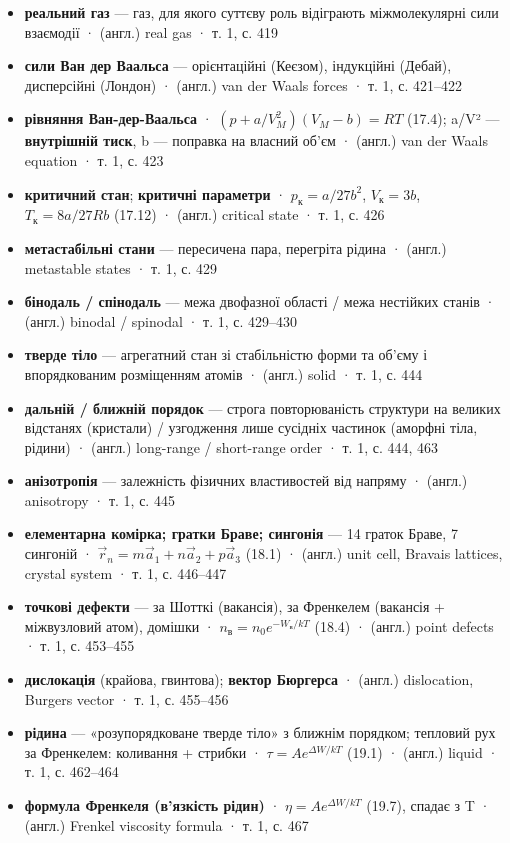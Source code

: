 \documentclass[11pt,a4paper,oneside]{book}
\newcommand{\book}{}
\begin{document}
\begin{itemize}
\item \textbf{реальний газ} — газ, для якого суттєву роль відіграють міжмолекулярні сили взаємодії · (англ.) real gas · \book{} т. 1, с. 419
\item \textbf{сили Ван дер Ваальса} — орієнтаційні (Кеєзом), індукційні (Дебай), дисперсійні (Лондон) · (англ.) van der Waals forces · \book{} т. 1, с. 421–422
\item \textbf{рівняння Ван-дер-Ваальса} · $(p + a/V_M^2)(V_M - b) = RT$ (17.4); a/V² — \textbf{внутрішній тиск}, b — поправка на власний об'єм · (англ.) van der Waals equation · \book{} т. 1, с. 423
\item \textbf{критичний стан}; \textbf{критичні параметри} · $p_\text{к} = a/27b^2$, $V_\text{к} = 3b$, $T_\text{к} = 8a/27Rb$ (17.12) · (англ.) critical state · \book{} т. 1, с. 426
\item \textbf{метастабільні стани} — пересичена пара, перегріта рідина · (англ.) metastable states · \book{} т. 1, с. 429
\item \textbf{бінодаль / спінодаль} — межа двофазної області / межа нестійких станів · (англ.) binodal / spinodal · \book{} т. 1, с. 429–430
\item \textbf{тверде тіло} — агрегатний стан зі стабільністю форми та об'єму і впорядкованим розміщенням атомів · (англ.) solid · \book{} т. 1, с. 444
\item \textbf{дальній / ближній порядок} — строга повторюваність структури на великих відстанях (кристали) / узгодження лише сусідніх частинок (аморфні тіла, рідини) · (англ.) long-range / short-range order · \book{} т. 1, с. 444, 463
\item \textbf{анізотропія} — залежність фізичних властивостей від напряму · (англ.) anisotropy · \book{} т. 1, с. 445
\item \textbf{елементарна комірка; гратки Браве; сингонія} — 14 граток Браве, 7 сингоній · $\vec r_n = m\vec a_1 + n\vec a_2 + p\vec a_3$ (18.1) · (англ.) unit cell, Bravais lattices, crystal system · \book{} т. 1, с. 446–447
\item \textbf{точкові дефекти} — за Шотткі (вакансія), за Френкелем (вакансія + міжвузловий атом), домішки · $n_{\text{в}} = n_0e^{-W_{\text{в}}/kT}$ (18.4) · (англ.) point defects · \book{} т. 1, с. 453–455
\item \textbf{дислокація} (крайова, гвинтова); \textbf{вектор Бюргерса} · (англ.) dislocation, Burgers vector · \book{} т. 1, с. 455–456
\item \textbf{рідина} — «розупорядковане тверде тіло» з ближнім порядком; тепловий рух за Френкелем: коливання + стрибки · $\tau = Ae^{\Delta W/kT}$ (19.1) · (англ.) liquid · \book{} т. 1, с. 462–464
\item \textbf{формула Френкеля (в'язкість рідин)} · $\eta = Ae^{\Delta W/kT}$ (19.7), спадає з T · (англ.) Frenkel viscosity formula · \book{} т. 1, с. 467
\end{itemize}
\end{document}
